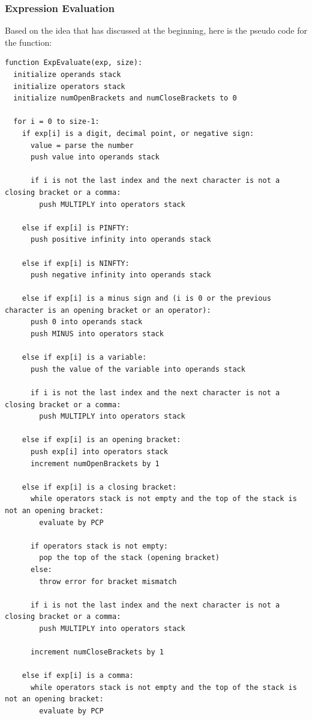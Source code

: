 \documentclass[a4paper, twoside]{report}
\begin{document}
\subsubsection{Expression Evaluation}
Based on the idea that has discussed at the beginning, here is the pseudo code for the function:
\begin{verbatim}
function ExpEvaluate(exp, size):
  initialize operands stack
  initialize operators stack
  initialize numOpenBrackets and numCloseBrackets to 0

  for i = 0 to size-1:
    if exp[i] is a digit, decimal point, or negative sign:
      value = parse the number
      push value into operands stack
      
      if i is not the last index and the next character is not a closing bracket or a comma:
        push MULTIPLY into operators stack
    
    else if exp[i] is PINFTY:
      push positive infinity into operands stack
    
    else if exp[i] is NINFTY:
      push negative infinity into operands stack
    
    else if exp[i] is a minus sign and (i is 0 or the previous character is an opening bracket or an operator):
      push 0 into operands stack
      push MINUS into operators stack
    
    else if exp[i] is a variable:
      push the value of the variable into operands stack
      
      if i is not the last index and the next character is not a closing bracket or a comma:
        push MULTIPLY into operators stack
    
    else if exp[i] is an opening bracket:
      push exp[i] into operators stack
      increment numOpenBrackets by 1
    
    else if exp[i] is a closing bracket:
      while operators stack is not empty and the top of the stack is not an opening bracket:
        evaluate by PCP
      
      if operators stack is not empty:
        pop the top of the stack (opening bracket)
      else:
        throw error for bracket mismatch
      
      if i is not the last index and the next character is not a closing bracket or a comma:
        push MULTIPLY into operators stack
      
      increment numCloseBrackets by 1
    
    else if exp[i] is a comma:
      while operators stack is not empty and the top of the stack is not an opening bracket:
        evaluate by PCP
    

\end{verbatim}
\end{document}

